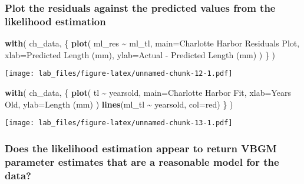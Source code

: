 \documentclass[
]{article}
\newenvironment{Shaded}{\begin{snugshade}}{\end{snugshade}}
\newcommand{\DataTypeTok}[1]{\textcolor[rgb]{0.13,0.29,0.53}{#1}}
\newcommand{\KeywordTok}[1]{\textcolor[rgb]{0.13,0.29,0.53}{\textbf{#1}}}
\newcommand{\NormalTok}[1]{#1}
\newcommand{\OperatorTok}[1]{\textcolor[rgb]{0.81,0.36,0.00}{\textbf{#1}}}
\newcommand{\StringTok}[1]{\textcolor[rgb]{0.31,0.60,0.02}{#1}}
\begin{document}
\hypertarget{plot-the-residuals-against-the-predicted-values-from-the-likelihood-estimation}{%
\subsubsection{Plot the residuals against the predicted values from the
likelihood
estimation}\label{plot-the-residuals-against-the-predicted-values-from-the-likelihood-estimation}}

\begin{Shaded}
\begin{Highlighting}[]
\KeywordTok{with}\NormalTok{(}
\NormalTok{  ch\_data, \{}
    \KeywordTok{plot}\NormalTok{(}
\NormalTok{      ml\_res }\OperatorTok{\textasciitilde{}}\StringTok{ }\NormalTok{ml\_tl,}
      \DataTypeTok{main=}\StringTok{\textquotesingle{}Charlotte Harbor Residuals Plot\textquotesingle{}}\NormalTok{,}
      \DataTypeTok{xlab=}\StringTok{\textquotesingle{}Predicted Length (mm)\textquotesingle{}}\NormalTok{,}
      \DataTypeTok{ylab=}\StringTok{\textquotesingle{}Actual {-} Predicted Length (mm)\textquotesingle{}}
\NormalTok{    )}
\NormalTok{  \}}
\NormalTok{)}
\end{Highlighting}
\end{Shaded}

\texttt{[image: lab\_files/figure-latex/unnamed-chunk-12-1.pdf]}

\begin{Shaded}
\begin{Highlighting}[]
\KeywordTok{with}\NormalTok{(}
\NormalTok{  ch\_data, \{}
    \KeywordTok{plot}\NormalTok{(}
\NormalTok{      tl }\OperatorTok{\textasciitilde{}}\StringTok{ }\NormalTok{yearsold,}
      \DataTypeTok{main=}\StringTok{\textquotesingle{}Charlotte Harbor Fit\textquotesingle{}}\NormalTok{,}
      \DataTypeTok{xlab=}\StringTok{\textquotesingle{}Years Old\textquotesingle{}}\NormalTok{,}
      \DataTypeTok{ylab=}\StringTok{\textquotesingle{}Length (mm)\textquotesingle{}}
\NormalTok{    )}
    \KeywordTok{lines}\NormalTok{(ml\_tl }\OperatorTok{\textasciitilde{}}\StringTok{ }\NormalTok{yearsold, }\DataTypeTok{col=}\StringTok{\textquotesingle{}red\textquotesingle{}}\NormalTok{)}
\NormalTok{  \}}
\NormalTok{)}
\end{Highlighting}
\end{Shaded}

\texttt{[image: lab\_files/figure-latex/unnamed-chunk-13-1.pdf]}

\hypertarget{does-the-likelihood-estimation-appear-to-return-vbgm-parameter-estimates-that-are-a-reasonable-model-for-the-data}{%
\subsubsection{Does the likelihood estimation appear to return VBGM
parameter estimates that are a reasonable model for the
data?}\label{does-the-likelihood-estimation-appear-to-return-vbgm-parameter-estimates-that-are-a-reasonable-model-for-the-data}}
\end{document}
